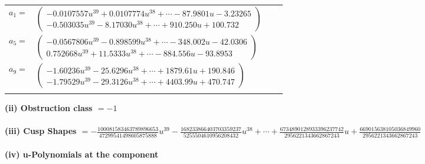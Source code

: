 \documentclass[1p]{elsarticle_modified}
\theoremstyle{definition}
\begin{document}
\begin{tabular}{m{7pt} m{180pt} m{7pt} m{180pt} }
\flushright $a_{1}=$&$\begin{pmatrix}-0.0107557 u^{39}+0.0107774 u^{38}+\cdots-87.9801 u-3.23265\\-0.503035 u^{39}-8.17030 u^{38}+\cdots+910.250 u+100.732\end{pmatrix}$ \\
\flushright $a_{5}=$&$\begin{pmatrix}-0.0567806 u^{39}-0.898599 u^{38}+\cdots-348.002 u-42.0306\\0.752668 u^{39}+11.5333 u^{38}+\cdots-884.556 u-93.8953\end{pmatrix}$ \\
\flushright $a_{9}=$&$\begin{pmatrix}-1.60236 u^{39}-25.6296 u^{38}+\cdots+1879.61 u+190.846\\-1.79529 u^{39}-29.3126 u^{38}+\cdots+4403.99 u+470.747\end{pmatrix}$\\&\end{tabular}
\flushleft \textbf{(ii) Obstruction class $= -1$}\\~\\
\flushleft \textbf{(iii) Cusp Shapes $= -\frac{100081583463789896653}{47299541498605875888} u^{39}-\frac{168233866403703359237}{5255504610956208432} u^{38}+\cdots+\frac{6734890128933396237742}{2956221343662867243} u+\frac{669015638105036849960}{2956221343662867243}$}\\~\\
\newpage\renewcommand{\arraystretch}{1}
\flushleft \textbf{(iv) u-Polynomials at the component}\newline \\
\end{document}
